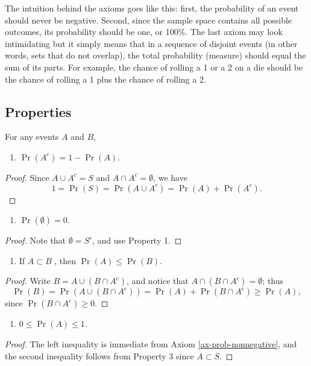 \documentclass[captions=tableheading]{scrbook}
\begin{document}
The intuition behind the axioms goes like this: first, the probability of an event should never be negative. Second, since the sample space contains all possible outcomes, its probability should be one, or 100\%. The last axiom may look intimidating but it simply means that in a sequence of disjoint events (in other words, sets that do not overlap), the total probability (measure) should equal the sum of its parts. For example, the chance of rolling a 1 or a 2 on a die should be the chance of rolling a 1 plus the chance of rolling a 2.
\subsection{Properties}
\label{sec-4-4-2}


For any events \(A\) and \(B\),
\begin{enumerate}
\item \(\Pr(A^{c})=1-\Pr(A)\).
\end{enumerate}
\begin{proof}
  Since \(A\cup A^{c}=S\) and \(A\cap A^{c}=\emptyset\), we have
  \[
  1=\Pr(S)=\Pr(A\cup A^{c})=\Pr(A)+\Pr(A^{c}).
  \]
\end{proof}
\begin{enumerate}
\item \(\Pr(\emptyset)=0\).
\end{enumerate}
\begin{proof}
  Note that \(\emptyset=S^{c}\), and use Property 1.
\end{proof}
\begin{enumerate}
\item If \(A\subset B\) , then \(\Pr(A)\leq\Pr(B)\).
\end{enumerate}
\begin{proof}
  Write \(B=A\cup\left(B\cap A^{c}\right)\), and notice that \(A\cap\left(B\cap A^{c}\right)=\emptyset\); thus
  \[
  \Pr(B)=\Pr(A\cup\left(B\cap A^{c}\right))=\Pr(A)+\Pr\left(B\cap A^{c}\right)\geq\Pr(A),
  \]
  since \(\Pr\left(B\cap A^{c}\right)\ge0\). 
\end{proof}
\begin{enumerate}
\item \(0\leq\Pr(A)\leq1\).
\end{enumerate}
\begin{proof}
  The left inequality is immediate from Axiom \ref{ax-prob-nonnegative}, and the second inequality follows from Property 3 since \(A\subset S\).
\end{proof}
\end{document}
